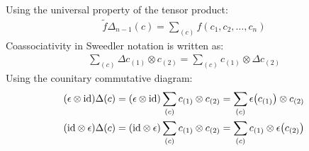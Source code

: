 \documentclass{article}
\theoremstyle{definition}
\newtheorem{Exercise}{Exercise}
\theoremstyle{remark}
\newtheorem*{Solution*}{Solution}
\theoremstyle{underline}
\theoremstyle{underline}
\newcommand{\id}{\mathrm{id}}
\begin{document}
	Using the universal property of the tensor product:
	\begin{gather*}
		\tilde{f} \Delta_{n-1}(c) = \sum_{(c)} f(c_1, c_2, \dots, c_n)
	\end{gather*}
	Coassociativity in Sweedler notation is written as:
	\begin{gather*}
		\sum_{(c)} \Delta c_{(1)} \otimes c_{(2)} = \sum_{(c)} c_{(1)} \otimes \Delta c_{(2)}
	\end{gather*}
	Using the counitary commutative diagram:
	\begin{gather*}
		\pqty{\epsilon \otimes \id}\Delta(c) = \pqty{\epsilon \otimes \id} \sum_{(c)} c_{(1)} \otimes c_{(2)} = \sum_{(c)} \epsilon\pqty{c_{(1)}} \otimes c_{(2)} \\
		\pqty{\id \otimes \epsilon}\Delta(c) = \pqty{\id \otimes \epsilon} \sum_{(c)} c_{(1)} \otimes c_{(2)} = \sum_{(c)} c_{(1)} \otimes \epsilon\pqty{c_{(2)}} 
	\end{gather*}

\end{document}
